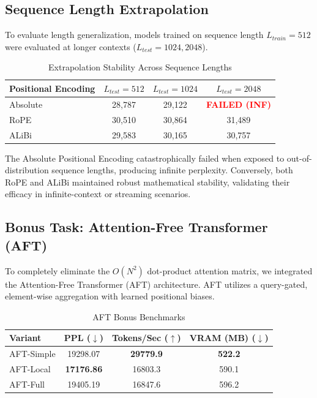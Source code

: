 \documentclass[11pt,a4paper]{article}
\begin{document}
\subsection{Sequence Length Extrapolation}
To evaluate length generalization, models trained on sequence length $L_{train}=512$ were evaluated at longer contexts ($L_{test}=1024, 2048$).

\begin{table}[h]
    \centering
    \caption{Extrapolation Stability Across Sequence Lengths}
    \begin{tabular}{lccc}
        \toprule
        \textbf{Positional Encoding} & $L_{test} = 512$ & $L_{test} = 1024$ & $L_{test} = 2048$ \\
        \midrule
        Absolute & 28,787 & 29,122 & \textcolor{red}{\textbf{FAILED (INF)}} \\
        RoPE & 30,510 & 30,864 & 31,489 \\
        ALiBi & 29,583 & 30,165 & 30,757 \\
        \bottomrule
    \end{tabular}
    \label{tab:extrapolation}
\end{table}

The Absolute Positional Encoding catastrophically failed when exposed to out-of-distribution sequence lengths, producing infinite perplexity. Conversely, both RoPE and ALiBi maintained robust mathematical stability, validating their efficacy in infinite-context or streaming scenarios.

\subsection{Bonus Task: Attention-Free Transformer (AFT)}
To completely eliminate the $O(N^2)$ dot-product attention matrix, we integrated the Attention-Free Transformer (AFT) architecture. AFT utilizes a query-gated, element-wise aggregation with learned positional biases.

\begin{table}[h]
    \centering
    \caption{AFT Bonus Benchmarks}
    \begin{tabular}{lccc}
        \toprule
        \textbf{Variant} & \textbf{PPL} ($\downarrow$) & \textbf{Tokens/Sec} ($\uparrow$) & \textbf{VRAM (MB)} ($\downarrow$) \\
        \midrule
        AFT-Simple & 19298.07 & \textbf{29779.9} & \textbf{522.2} \\
        AFT-Local  & \textbf{17176.86} & 16803.3 & 590.1 \\
        AFT-Full   & 19405.19 & 16847.6 & 596.2 \\
        \bottomrule
    \end{tabular}
    \label{tab:aft_benchmarks}
\end{table}
\end{document}
